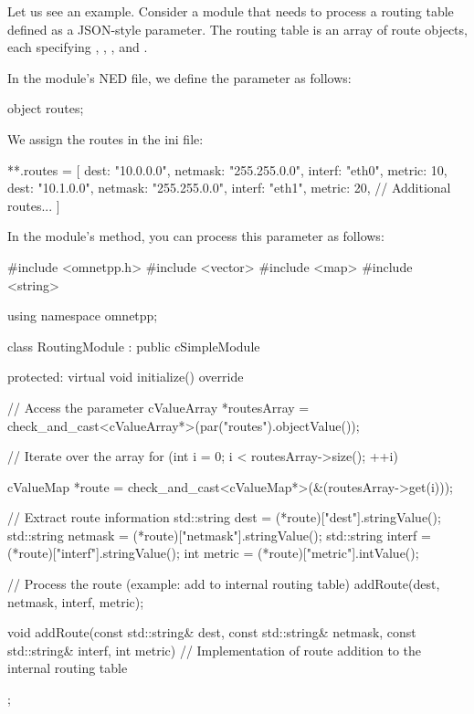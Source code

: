 Let us see an example. Consider a module that needs to process a routing table
defined as a JSON-style parameter. The routing table is an array of route
objects, each specifying , , , and
.

In the module's NED file, we define the parameter as follows:

\begin{ned}
  object routes;
\end{ned}

We assign the routes in the ini file:

\begin{inifile}
**.routes = [
        {dest: "10.0.0.0", netmask: "255.255.0.0", interf: "eth0", metric: 10},
        {dest: "10.1.0.0", netmask: "255.255.0.0", interf: "eth1", metric: 20},
        // Additional routes...
    ]
\end{inifile}

In the module's  method, you can process this parameter as follows:

\begin{cpp}
#include <omnetpp.h>
#include <vector>
#include <map>
#include <string>

using namespace omnetpp;

class RoutingModule : public cSimpleModule {
protected:
    virtual void initialize() override {
        // Access the parameter
        cValueArray *routesArray = check_and_cast<cValueArray*>(par("routes").objectValue());

        // Iterate over the array
        for (int i = 0; i < routesArray->size(); ++i) {
            cValueMap *route = check_and_cast<cValueMap*>(&(routesArray->get(i)));

            // Extract route information
            std::string dest = (*route)["dest"].stringValue();
            std::string netmask = (*route)["netmask"].stringValue();
            std::string interf = (*route)["interf"].stringValue();
            int metric = (*route)["metric"].intValue();

            // Process the route (example: add to internal routing table)
            addRoute(dest, netmask, interf, metric);
        }
    }

    void addRoute(const std::string& dest, const std::string& netmask,
                  const std::string& interf, int metric) {
        // Implementation of route addition to the internal routing table
    }
};
\end{cpp}

